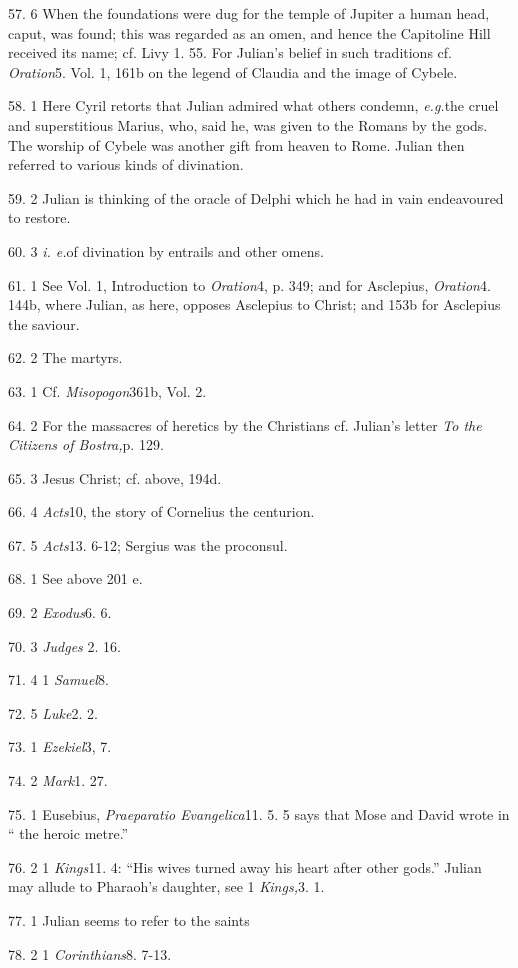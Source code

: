 57. 6 When the foundations were dug for the temple of Jupiter a human head, caput, was found; this was regarded as an omen, and hence the Capitoline Hill received its name; cf. Livy 1. 55. For Julian's belief in such traditions cf. \emph{Oration}5. Vol. 1, 161b on the legend of Claudia and the image of Cybele.

58. 1 Here Cyril retorts that Julian admired what others condemn, \emph{e.g.}the cruel and superstitious Marius, who, said he, was given to the Romans by the gods. The worship of Cybele was another gift from heaven to Rome. Julian then referred to various kinds of divination.

59. 2 Julian is thinking of the oracle of Delphi which he had in vain endeavoured to restore.

60. 3 \emph{i. e.}of divination by entrails and other omens.

61. 1 See Vol. 1, Introduction to \emph{Oration}4, p. 349; and for Asclepius, \emph{Oration}4. 144b, where Julian, as here, opposes Asclepius to Christ; and 153b for Asclepius the
saviour.

62. 2 The martyrs.

63. 1 Cf. \emph{Misopogon}361b, Vol. 2.

64. 2 For the massacres of heretics by the Christians cf. Julian's letter \emph{To the Citizens of Bostra,}p. 129.

65. 3 Jesus Christ; cf. above, 194d.

66. 4 \emph{Acts}10, the story of Cornelius the
centurion.

67. 5 \emph{Acts}13. 6-12; Sergius was the proconsul.

68. 1 See above 201 e.

69. 2 \emph{Exodus}6. 6.

70. 3 \emph{Judges} 2. 16.

71. 4 1 \emph{Samuel}8.

72. 5 \emph{Luke}2. 2.

73. 1 \emph{Ezekiel}3, 7.

74. 2 \emph{Mark}1. 27.

75. 1 Eusebius, \emph{Praeparatio Evangelica}11. 5. 5 says that Mose and David wrote in `` the heroic metre.''

76. 2 1 \emph{Kings}11. 4: ``His wives turned away his heart after
other gods.'' Julian may allude to Pharaoh's daughter, see 1 \emph{Kings,}3. 1.

77. 1 Julian seems to refer to the saints

78. 2 1 \emph{Corinthians}8. 7-13.

